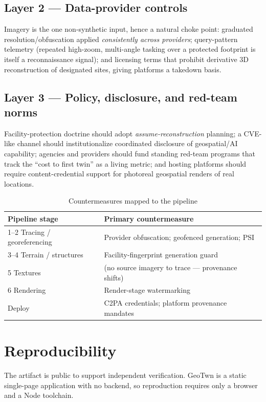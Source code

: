 \documentclass[conference]{IEEEtran}
\begin{document}
\subsection{Layer 2 --- Data-provider controls}
Imagery is the one non-synthetic input, hence a natural choke point: graduated
resolution/obfuscation applied \emph{consistently across providers}; query-pattern
telemetry (repeated high-zoom, multi-angle tasking over a protected footprint is
itself a reconnaissance signal); and licensing terms that prohibit derivative 3D
reconstruction of designated sites, giving platforms a takedown basis.

\subsection{Layer 3 --- Policy, disclosure, and red-team norms}
Facility-protection doctrine should adopt \emph{assume-reconstruction} planning; a
CVE-like channel should institutionalize coordinated disclosure of geospatial/AI
capability; agencies and providers should fund standing red-team programs that
track the ``cost to first twin'' as a living metric; and hosting platforms should
require content-credential support for photoreal geospatial renders of real
locations.

\begin{table}[t]
\caption{Countermeasures mapped to the pipeline}
\label{tab:defense}
\centering
\begin{tabular}{@{}ll@{}}
\toprule
\textbf{Pipeline stage} & \textbf{Primary countermeasure} \\
\midrule
1--2 Tracing / georeferencing & Provider obfuscation; geofenced generation; PSI \\
3--4 Terrain / structures     & Facility-fingerprint generation guard \\
5\phantom{--6} Textures       & (no source imagery to trace --- provenance shifts) \\
6\phantom{--6} Rendering      & Render-stage watermarking \\
Deploy                        & C2PA credentials; platform provenance mandates \\
\bottomrule
\end{tabular}
\end{table}

\section{Reproducibility}
\label{sec:repro}
The artifact is public to support independent verification. GeoTwn is a static
single-page application with no backend, so reproduction requires only a browser
and a Node toolchain.
\end{document}
